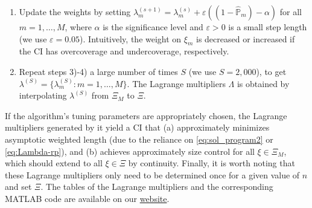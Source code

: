 \begin{enumerate}[1)]
\item Update the weights by setting $\lambda _{m}^{(s+1)}=\lambda _{m}^{(s)}+\varepsilon ((1-\mathbb{\hat{P}}_{m})-\alpha )$ for all $ m=1,\dots ,M$, where $\alpha $ is the significance level and $\varepsilon >0$ is a small step length (we use $\varepsilon =0.05$). Intuitively, the weight on $\xi _{m}$ is decreased or increased if the CI has overcoverage and undercoverage, respectively.

\item Repeat steps 3)-4) a large number of times $S$ (we use $S=2,000$), to get $\lambda^{(S)}=\{\lambda _{m}^{(S)}:m=1,\dots ,M\}$. The Lagrange multipliers  $\Lambda$ is obtained by interpolating $\lambda^{(S)}$ from $\Xi _{M}$ to $\Xi$.


\end{enumerate}
If the algorithm's tuning parameters are appropriately chosen, the Lagrange multipliers generated by it yield a CI that (a) approximately minimizes asymptotic weighted length (due to the reliance on \eqref{eq:sol_program2} or \eqref{eq:Lambda-rp}), and (b) achieves approximately size control for all $\xi \in \Xi _{M}$, which should extend to all $\xi \in \Xi$ by continuity. Finally, it is worth noting that these Lagrange multipliers only need to be determined once for a given value of $n$ and set $\Xi$.
The tables of the Lagrange multipliers and the corresponding MATLAB code are available on our \href{https://drive.google.com/file/d/1XGZjG-FaTKMqRK_aQ08EQ0TlG7iAbsHK/view}{website}.

